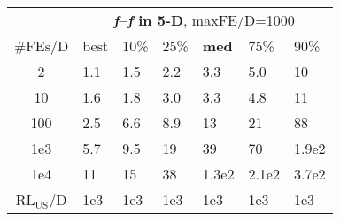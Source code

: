 \begin{tabular}{c|llllll}
 & \multicolumn{6}{|c}{\textbf{\textit{f}\raisebox{-0.35ex}{1}--\textit{f}\raisebox{-0.35ex}{24} in 5-D}, maxFE/D=1000}\\
\#FEs/D & best & 10\% & 25\% & \textbf{med} & 75\% & 90\%\\
2 & \hspace*{1ex}1.1 & \hspace*{1ex}1.5 & \hspace*{1ex}2.2 & \hspace*{1ex}3.3 & \hspace*{1ex}5.0 & 10\\
10 & \hspace*{1ex}1.6 & \hspace*{1ex}1.8 & \hspace*{1ex}3.0 & \hspace*{1ex}3.3 & \hspace*{1ex}4.8 & 11\\
100 & \hspace*{1ex}2.5 & \hspace*{1ex}6.6 & \hspace*{1ex}8.9 & 13 & 21 & 88\\
1e3 & \hspace*{1ex}5.7 & \hspace*{1ex}9.5 & 19 & 39 & 70 & 1.9e2\\
1e4 & 11 & 15 & 38 & 1.3e2 & 2.1e2 & 3.7e2\\
$\text{RL}_{\text{US}}$/D & 1e3 & 1e3 & 1e3 & 1e3 & 1e3 & 1e3
\end{tabular}
